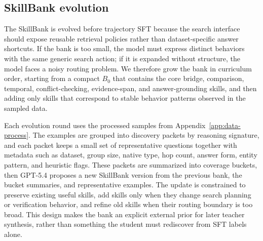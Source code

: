 \documentclass{article}
\begin{document}
\subsection{SkillBank evolution}
\label{app:skillbank-evolution}

The SkillBank is evolved before trajectory SFT because the search interface should expose reusable retrieval policies rather than dataset-specific answer shortcuts. If the bank is too small, the model must express distinct behaviors with the same generic search action; if it is expanded without structure, the model faces a noisy routing problem. We therefore grow the bank in curriculum order, starting from a compact \(B_0\) that contains the core bridge, comparison, temporal, conflict-checking, evidence-span, and answer-grounding skills, and then adding only skills that correspond to stable behavior patterns observed in the sampled data.

Each evolution round uses the processed samples from Appendix~\ref{app:data-process}. The examples are grouped into discovery packets by reasoning signature, and each packet keeps a small set of representative questions together with metadata such as dataset, group size, native type, hop count, answer form, entity pattern, and heuristic flags. These packets are summarized into coverage buckets, then \textsc{GPT-5.4} proposes a new SkillBank version from the previous bank, the bucket summaries, and representative examples. The update is constrained to preserve existing useful skills, add skills only when they change search planning or verification behavior, and refine old skills when their routing boundary is too broad. This design makes the bank an explicit external prior for later teacher synthesis, rather than something the student must rediscover from SFT labels alone.
\end{document}

